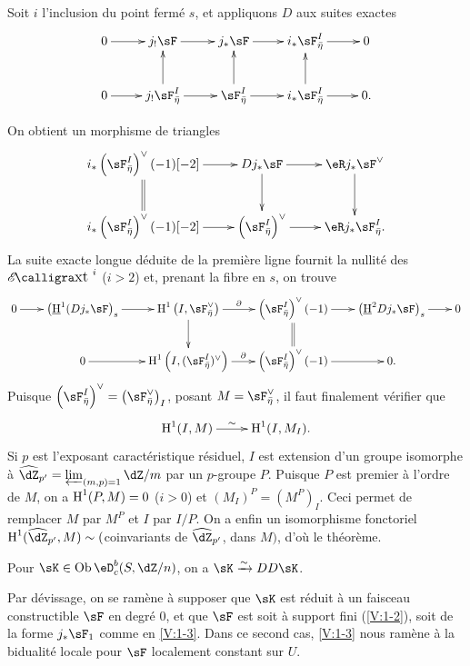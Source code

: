 Soit $i$ l'inclusion du point fermé $s$, et appliquons $D$ aux suites 
exactes 
\[\xymatrix{
  0 \ar[r] 
    & j_! \sF \ar[r] 
    & j_\ast \sF \ar[r] 
    & i_\ast \sF_{\bar\eta}^I \ar[r] 
    & 0 \\
  0 \ar[r] 
    & j_! \sF_{\bar\eta}^I \ar[r] \ar[u] 
    & \sF_{\bar\eta}^I \ar[r] \ar[u] 
    & i_\ast \sF_{\bar\eta}^I \ar[r] \ar[u]
    & 0 \text{.}
}\]

On obtient un morphisme de triangles 
\[\xymatrix{
  i_\ast\left(\sF_{\bar\eta}^I\right)^\vee (-1)[-2] \ar[r] \ar@{=}[d] 
    & D j_\ast\sF \ar[r] \ar[d] 
    & \eR j_\ast \sF^\vee \ar[d] \\
  i_\ast\left(\sF_{\bar\eta}^I\right)^\vee(-1)[-2] \ar[r] 
    & \left(\sF_{\bar\eta}^I\right)^\vee \ar[r] 
    & \eR j_\ast \sF_{\bar\eta}^I \text{.}
}\]
La suite exacte longue déduite de la première ligne fournit la nullité des 
$\Ext^i$ ($i>2$) et, prenant la fibre en $s$, on trouve 
\[\xymatrix@=0.7cm{
  0 \ar[r] 
    & \left(\underline\h^1(D j_\ast\sF\right)_s \ar[r] 
    & \h^1\left(I,\sF_{\bar\eta}^\vee\right) \ar[r]^-\partial \ar[d] 
    & \left(\sF_{\bar\eta}^I\right)^\vee(-1) \ar[r] \ar@{=}[d] 
    & \left(\underline\h^2 D j_\ast\sF\right)_s \ar[r] 
    & 0 \\
  & 0 \ar[r] 
    & \h^1\left(I,(\sF_{\bar\eta}^I)^\vee\right) \ar[r]^-\partial 
    & \left(\sF_{\bar\eta}^I\right)^\vee(-1) \ar[r] 
    & 0 \text{.}
}\]
Puisque 
$\left(\sF_{\bar\eta}^I\right)^\vee = \left(\sF_{\bar\eta}^\vee\right)_I$, 
posant $M=\sF_{\bar\eta}^\vee$, il faut finalement vérifier que 
\[\xymatrix{
  \h^1(I,M) \ar[r]^-\sim 
    & \h^1(I,M_I) \text{.}
}\]
Si $p$ est l'exposant caractéristique résiduel, $I$ est extension d'un 
groupe isomorphe à $\widehat\dZ_{p'} = \varprojlim_{(m,p)=1} \dZ/m$ par un 
$p$-groupe $P$. Puisque $P$ est premier à l'ordre de $M$, on a 
$\operatorname{H}^1(P,M)=0$ ($i>0$) et $(M_I)^P=(M^P)_I$. Ceci permet de remplacer $M$ par 
$M^P$ et $I$ par $I/P$. On a enfin un isomorphisme fonctoriel 
$\h^1(\widehat\dZ_{p'},M)\sim ($coinvariants de $\widehat\dZ_{p'}$, dans $M)$, 
d'où le théorème. 





\begin{theorem_}\label{V:1-4}
Pour $\sK\in \ob\eD_c^b(S,\dZ/n)$, on a $\sK\iso D D \sK$.
\end{theorem_}

Par dévissage, on se ramène à supposer que $\sK$ est réduit à un 
faisceau constructible $\sF$ en degré $0$, et que $\sF$ est soit à support 
fini (\ref{V:1-2}), soit de la forme $j_\ast\sF_1$ comme en \ref{V:1-3}. Dans 
ce second cas, \ref{V:1-3} nous ramène à la bidualité locale pour $\sF$ 
localement constant sur $U$. 










